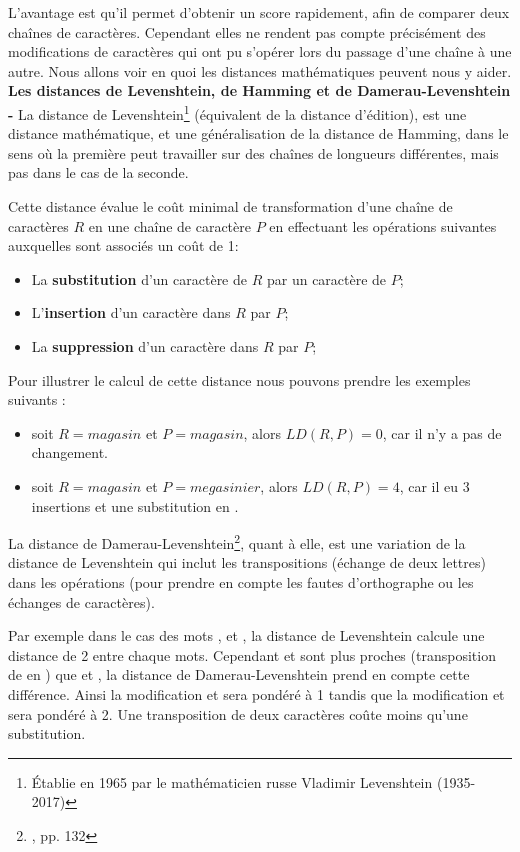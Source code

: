 L'avantage est qu'il permet d'obtenir un score rapidement, afin de comparer deux chaînes de caractères. Cependant elles ne rendent pas compte précisément des modifications de caractères qui ont pu s'opérer lors du passage d'une chaîne à une autre. Nous allons voir en quoi les distances mathématiques peuvent nous y aider.\\
\newpage
\textbf{Les distances de Levenshtein, de Hamming et de Damerau-Levenshtein -} La distance de Levenshtein\footnote{Établie en 1965 par le mathématicien russe Vladimir Levenshtein (1935-2017)} (équivalent de la distance d'édition), est une distance mathématique, et une généralisation de la distance de Hamming, dans le sens où la première peut travailler sur des chaînes de longueurs différentes, mais pas dans le cas de la seconde.

Cette distance évalue le coût minimal de transformation d'une chaîne de caractères $R$ en une chaîne de caractère $P$ en effectuant les opérations suivantes auxquelles sont associés un coût de 1:

\begin{itemize}
    \item La \textbf{substitution} d'un caractère de $R$ par un caractère de $P$;
    \item L'\textbf{insertion} d'un caractère dans $R$ par $P$;
    \item La \textbf{suppression} d'un caractère dans $R$ par $P$;
\end{itemize}

Pour illustrer le calcul de cette distance nous pouvons prendre les exemples suivants :

\begin{itemize}
    \item soit $R = magasin$ et $P= magasin$, alors $LD(R, P) = 0$, car il n'y a pas de changement.
    \item soit $R = magasin$ et $P= megasinier $, alors $LD(R, P) = 4$, car il eu 3 insertions  et une substitution  en . 
\end{itemize} 
\bigskip

La distance de Damerau-Levenshtein\footnote{\cite{chaumartin_traitement_2020}, pp. 132}, quant à elle, est une variation de la distance de Levenshtein qui inclut les transpositions (échange de deux lettres) dans les opérations (pour prendre en compte les fautes d'orthographe ou les échanges de caractères).

Par exemple dans le cas des mots ,  et , la distance de Levenshtein calcule une distance de 2 entre chaque mots. Cependant  et  sont plus proches (transposition de  en ) que  et , la distance de Damerau-Levenshtein prend en compte cette différence. Ainsi la modification  et  sera pondéré à 1 tandis que la modification  et  sera pondéré à 2. Une transposition de deux caractères coûte moins qu'une substitution. 

